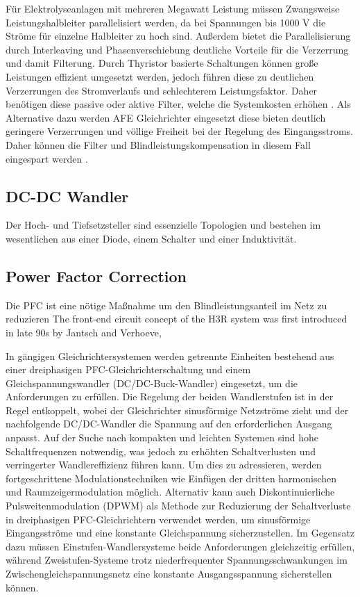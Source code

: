		Für Elektrolyseanlagen mit mehreren Megawatt Leistung müssen Zwangsweise Leistungshalbleiter parallelisiert werden, da bei Spannungen bis 1000 V die Ströme für einzelne Halbleiter zu hoch sind. Außerdem bietet die Parallelisierung durch Interleaving und Phasenverschiebung deutliche Vorteile für die Verzerrung und damit Filterung. Durch Thyristor basierte Schaltungen können große Leistungen effizient umgesetzt werden, jedoch führen diese zu deutlichen Verzerrungen des Stromverlaufs und schlechterem Leistungsfaktor. Daher benötigen diese passive oder aktive Filter, welche die Systemkosten erhöhen \cite{HydrogenElectronicTopologies}.
		Als Alternative dazu werden \gls{AFE} Gleichrichter eingesetzt diese bieten deutlich geringere Verzerrungen und völlige Freiheit bei der Regelung des Eingangsstroms. Daher können die Filter und Blindleistungskompensation in diesem Fall eingespart werden \cite{HydrogenElectronicTopologies}.
		
		\subsection{DC-DC Wandler}
		Der Hoch- und Tiefsetzsteller sind essenzielle Topologien und bestehen im wesentlichen aus einer Diode, einem Schalter und einer Induktivität. 
			
		\subsection{Power Factor Correction}
			Die \gls{PFC} ist eine nötige Maßnahme um den Blindleistungsanteil im Netz zu reduzieren 
			The front-end circuit concept of the H3R system was first introduced in late 90s by Jantsch and Verhoeve,

In gängigen Gleichrichtersystemen werden getrennte Einheiten bestehend aus einer dreiphasigen PFC-Gleichrichterschaltung und einem Gleichspannungswandler (DC/DC-Buck-Wandler) eingesetzt, um die Anforderungen zu erfüllen. Die Regelung der beiden Wandlerstufen ist in der Regel entkoppelt, wobei der Gleichrichter sinusförmige Netzströme zieht und der nachfolgende DC/DC-Wandler die Spannung auf den erforderlichen Ausgang anpasst. Auf der Suche nach kompakten und leichten Systemen sind hohe Schaltfrequenzen notwendig, was jedoch zu erhöhten Schaltverlusten und verringerter Wandlereffizienz führen kann. Um dies zu adressieren, werden fortgeschrittene Modulationstechniken wie Einfügen der dritten harmonischen und Raumzeigermodulation möglich. Alternativ kann auch Diskontinuierliche Pulsweitenmodulation (DPWM) als Methode zur Reduzierung der Schaltverluste in dreiphasigen PFC-Gleichrichtern verwendet werden, um sinusförmige Eingangsströme und eine konstante Gleichspannung sicherzustellen. Im Gegensatz dazu müssen Einstufen-Wandlersysteme beide Anforderungen gleichzeitig erfüllen, während Zweistufen-Systeme trotz niederfrequenter Spannungsschwankungen im Zwischengleichspannungsnetz eine konstante Ausgangsspannung sicherstellen können.			
			
